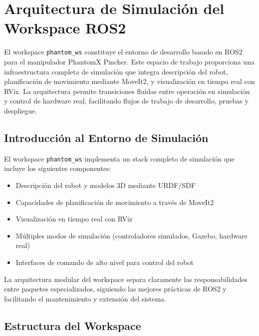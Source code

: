 \section{Arquitectura de Simulación del Workspace ROS2}

El workspace \texttt{phantom\_ws} constituye el entorno de desarrollo basado en ROS2 para el manipulador PhantomX Pincher. Este espacio de trabajo proporciona una infraestructura completa de simulación que integra descripción del robot, planificación de movimiento mediante MoveIt2, y visualización en tiempo real con RViz. La arquitectura permite transiciones fluidas entre operación en simulación y control de hardware real, facilitando flujos de trabajo de desarrollo, pruebas y despliegue.

\subsection{Introducción al Entorno de Simulación}

El workspace \texttt{phantom\_ws} implementa un stack completo de simulación que incluye los siguientes componentes:

\begin{itemize}
    \item Descripción del robot y modelos 3D mediante URDF/SDF
    \item Capacidades de planificación de movimiento a través de MoveIt2
    \item Visualización en tiempo real con RViz
    \item Múltiples modos de simulación (controladores simulados, Gazebo, hardware real)
    \item Interfaces de comando de alto nivel para control del robot
\end{itemize}

La arquitectura modular del workspace separa claramente las responsabilidades entre paquetes especializados, siguiendo las mejores prácticas de ROS2 y facilitando el mantenimiento y extensión del sistema.

\subsection{Estructura del Workspace}

